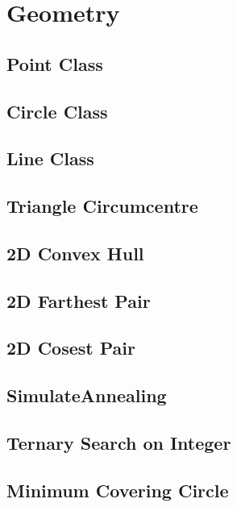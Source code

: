 \documentclass[a4paper,10pt,twocolumn,oneside]{article}
\begin{document}
\section{Geometry}
\subsection{Point Class}

\subsection{Circle Class}

\subsection{Line Class}

\subsection{Triangle Circumcentre}

\subsection{2D Convex Hull}

\subsection{2D Farthest Pair}

\subsection{2D Cosest Pair}

\subsection{SimulateAnnealing}

\subsection{Ternary Search on Integer}

\subsection{Minimum Covering Circle}

\end{document}

